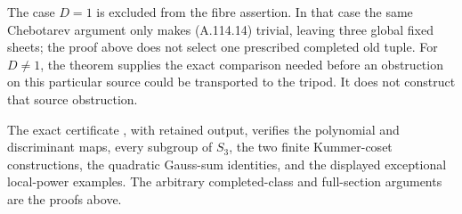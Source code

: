 The case $D=1$ is excluded from
the fibre assertion.  In that
case the same Chebotarev argument
only makes (A.114.14) trivial,
leaving three global fixed sheets;
the proof above does not select
one prescribed completed old tuple.
For $D\ne1$, the theorem supplies
the exact comparison needed before
an obstruction on this particular
source could be transported to the
tripod.  It does not construct
that source obstruction.

The exact certificate
,
with retained output, verifies the polynomial
and discriminant maps, every subgroup of $S_3$,
the two finite Kummer-coset constructions,
the quadratic Gauss-sum identities, and
the displayed exceptional local-power examples.
The arbitrary completed-class and full-section
arguments are the proofs above.
